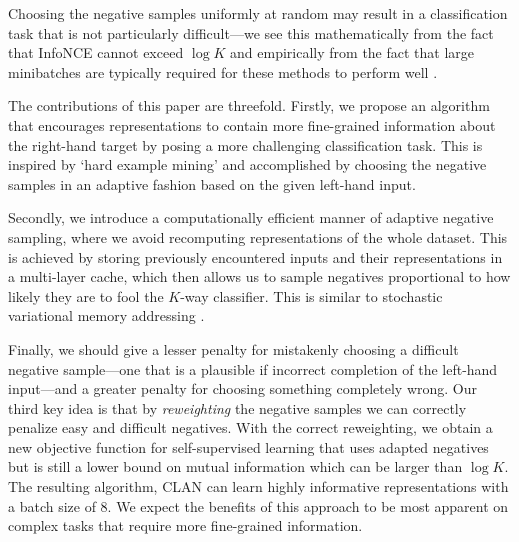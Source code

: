 Choosing the negative samples uniformly at random may result in a classification task that is not particularly difficult---we see this mathematically from the fact that InfoNCE cannot exceed $\log K$ \cite{poole2019variational} and empirically from the fact that large minibatches are typically required for these methods to perform well \cite{henaff2019data,ozair2019wasserstein}.

The contributions of this paper are threefold. 
Firstly, we propose an algorithm that encourages representations to contain more fine-grained information about the right-hand target by posing a more challenging classification task.
This is inspired by `hard example mining' \cite{shrivastava2016training} and accomplished by choosing the negative samples in an adaptive fashion based on the given left-hand input.
%

Secondly, we introduce a computationally efficient manner of adaptive negative sampling, where we avoid recomputing representations of the whole dataset.
This is achieved by storing previously encountered inputs and their representations in a multi-layer cache, which then allows us to sample negatives proportional to how likely they are to fool the $K$-way classifier.
This is similar to stochastic variational memory addressing \cite{bornschein2017vma}.


Finally, we should give a lesser penalty for mistakenly choosing a difficult negative sample---one that is a plausible if incorrect completion of the left-hand input---and a greater penalty for choosing something completely wrong.
Our third key idea is that by \textit{reweighting} the negative samples we can correctly penalize easy and difficult negatives.
With the correct reweighting, we obtain a new objective function for self-supervised learning that uses adapted negatives but is still a lower bound on mutual information which can be larger than $\log K$.
The resulting algorithm, CLAN can learn highly informative representations with a batch size of 8.
We expect the benefits of this approach to be most apparent on complex tasks that require more fine-grained information.

